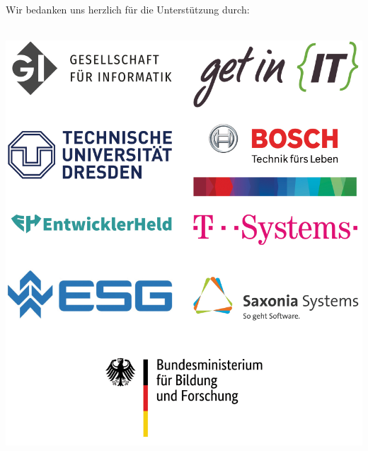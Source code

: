 Wir bedanken uns herzlich für die Unterstützung durch:\\~

\begin{center}
\includegraphics[width=.85\textwidth,keepaspectratio]{img/Sponsorenseite_ohne_infineon}
\end{center}
